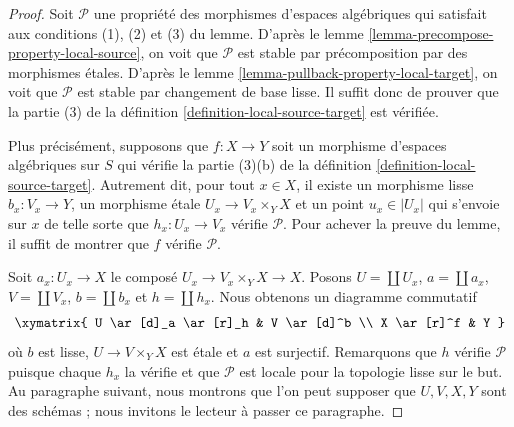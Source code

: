 \begin{proof}
Soit $\mathcal{P}$ une propriété des morphismes d'espaces algébriques qui
satisfait aux conditions (1), (2) et (3) du lemme. D'après le
lemme \ref{lemma-precompose-property-local-source},
on voit que $\mathcal{P}$ est stable par précomposition par des
morphismes \'etales. D'après le
lemme \ref{lemma-pullback-property-local-target},
on voit que $\mathcal{P}$ est stable par changement de base lisse.
Il suffit donc de prouver que la partie (3) de la
définition \ref{definition-local-source-target}
est vérifiée.

\medskip\noindent
Plus précisément, supposons que $f : X \to Y$ soit un morphisme
d'espaces algébriques sur $S$ qui vérifie la
partie (3)(b) de la définition \ref{definition-local-source-target}.
Autrement dit, pour tout $x \in X$, il existe
un morphisme lisse $b_x : V_x \to Y$,
un morphisme \'etale $U_x \to V_x \times_Y X$ et
un point $u_x \in |U_x|$ qui s'envoie sur $x$
de telle sorte que $h_x : U_x \to V_x$ vérifie $\mathcal{P}$.
Pour achever la preuve du lemme, il suffit de montrer que $f$ vérifie $\mathcal{P}$.

\medskip\noindent
Soit $a_x : U_x \to X$ le composé $U_x \to V_x \times_Y X \to X$.
Posons $U = \coprod U_x$, $a = \coprod a_x$, $V = \coprod V_x$,
$b = \coprod b_x$ et $h = \coprod h_x$. Nous obtenons un
diagramme commutatif
$$
\xymatrix{
U \ar[d]_a \ar[r]_h & V \ar[d]^b \\
X \ar[r]^f & Y
}
$$
où $b$ est lisse, $U \to V \times_Y X$ est \'etale et $a$ est surjectif.
Remarquons que $h$ vérifie $\mathcal{P}$ puisque chaque $h_x$ la vérifie et que $\mathcal{P}$
est locale pour la topologie lisse sur le but. Au paragraphe suivant, nous montrons
que l'on peut supposer que $U, V, X, Y$ sont des schémas ; nous invitons le lecteur
à passer ce paragraphe.


\end{proof}
